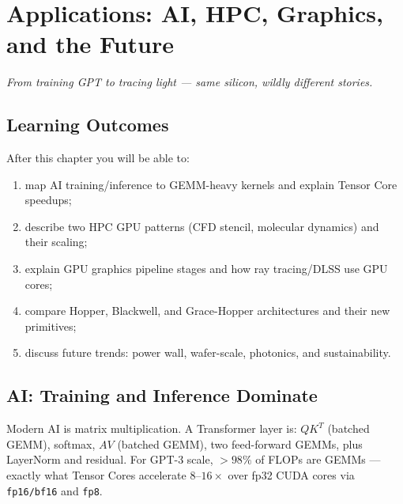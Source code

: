 \chapter{Applications: AI, HPC, Graphics, and the Future}\label{ch:applications}
\sloppy

\begin{center}\small\textit{From training GPT to tracing light --- same silicon, wildly different stories.}\end{center}

\noindent{}
\vspace{0.4em}

\section*{Learning Outcomes}
After this chapter you will be able to:
\begin{enumerate}[label=(L\arabic*)]
    \item map AI training/inference to GEMM-heavy kernels and explain Tensor Core speedups;
    \item describe two HPC GPU patterns (CFD stencil, molecular dynamics) and their scaling;
    \item explain GPU graphics pipeline stages and how ray tracing/DLSS use GPU cores;
    \item compare Hopper, Blackwell, and Grace-Hopper architectures and their new primitives;
    \item discuss future trends: power wall, wafer-scale, photonics, and sustainability.
\end{enumerate}

\section{AI: Training and Inference Dominate}
Modern AI is matrix multiplication. A Transformer layer is: $QK^{T}$ (batched GEMM), softmax, $AV$ (batched GEMM), two feed-forward GEMMs, plus LayerNorm and residual. For GPT-3 scale, $>98\%$ of FLOPs are GEMMs --- exactly what Tensor Cores accelerate $8$--$16\times$ over fp32 CUDA cores via \texttt{fp16/bf16} and \texttt{fp8}.

